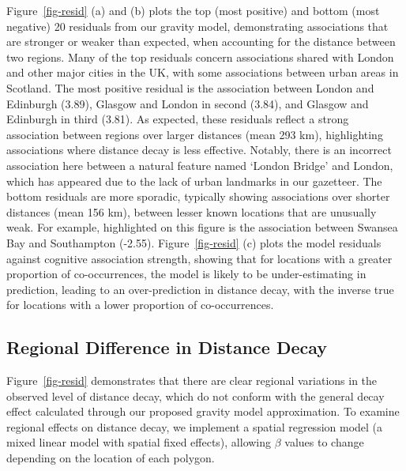 \documentclass[
  letterpaper,
  11pt,
  english,
  onehalfspacing,
  headsepline]{MastersDoctoralThesis}
\begin{document}
Figure~\ref{fig-resid} (a) and (b) plots the top (most positive) and
bottom (most negative) 20 residuals from our gravity model,
demonstrating associations that are stronger or weaker than expected,
when accounting for the distance between two regions. Many of the top
residuals concern associations shared with London and other major cities
in the UK, with some associations between urban areas in Scotland. The
most positive residual is the association between London and Edinburgh
(3.89), Glasgow and London in second (3.84), and Glasgow and Edinburgh
in third (3.81). As expected, these residuals reflect a strong
association between regions over larger distances (mean 293 km),
highlighting associations where distance decay is less effective.
Notably, there is an incorrect association here between a natural
feature named `London Bridge' and London, which has appeared due to the
lack of urban landmarks in our gazetteer. The bottom residuals are more
sporadic, typically showing associations over shorter distances (mean
156 km), between lesser known locations that are unusually weak. For
example, highlighted on this figure is the association between Swansea
Bay and Southampton (-2.55). Figure~\ref{fig-resid} (c) plots the model
residuals against cognitive association strength, showing that for
locations with a greater proportion of co-occurrences, the model is
likely to be under-estimating in prediction, leading to an
over-prediction in distance decay, with the inverse true for locations
with a lower proportion of co-occurrences.

\hypertarget{regional-difference-in-distance-decay}{%
\subsection{Regional Difference in Distance
Decay}\label{regional-difference-in-distance-decay}}

Figure~\ref{fig-resid} demonstrates that there are clear regional
variations in the observed level of distance decay, which do not conform
with the general decay effect calculated through our proposed gravity
model approximation. To examine regional effects on distance decay, we
implement a spatial regression model (a mixed linear model with spatial
fixed effects), allowing \(\beta\) values to change depending on the
location of each polygon.
\end{document}
